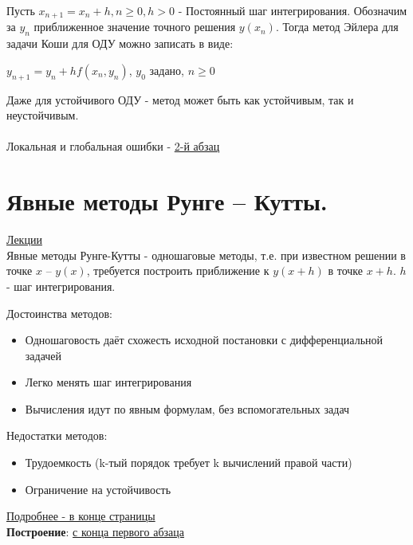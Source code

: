 \documentclass[specialist, subf, href, colorlinks=true, 12pt, times, mtpro, final]{disser}
\theoremstyle{definition}
\begin{document}
{    Пусть $x_{n+1} = x_n + h, n \geq 0, h > 0$ - Постоянный шаг интегрирования. Обозначим за $y_n$ приближенное значение точного решения $y(x_n)$. Тогда метод Эйлера для задачи Коши для ОДУ можно записать в виде:\\
    \begin{center}
    $y_{n+1} = y_n + h f(x_n, y_n)$, $y_0$ задано, $n \geq 0$
    \end{center}

Даже для устойчивого ОДУ -  метод может быть как устойчивым, так и неустойчивым.\\
\\
Локальная и глобальная ошибки - \hyperlink {lects.88}{2-й абзац}


\section {Явные методы Рунге -- Кутты.}
    \hyperlink {lects.89}{Лекции}\\
    
    Явные методы Рунге-Кутты - одношаговые методы, т.е. при известном решении в точке $x$ \--- $y(x)$, требуется построить приближение к $y(x+h)$ в точке $x+h$. $h$ - шаг интегрирования.
    
    Достоинства методов:
    \begin{itemize}
    \item Одношаговость даёт схожесть исходной постановки с дифференциальной задачей
    \item Легко менять шаг интегрирования
    \item Вычисления идут по явным формулам, без вспомогательных задач
    \end{itemize}
    Недостатки методов:
    \begin{itemize}
    \item Трудоемкость (k-тый порядок требует k вычислений правой части)
    \item Ограничение на устойчивость 
    \end{itemize}
    \hyperlink {lects.90}{Подробнее - в конце страницы}\\

    \textbf{Построение}: \hyperlink {lects.89}{с конца первого абзаца}\\

}
\end{document}
